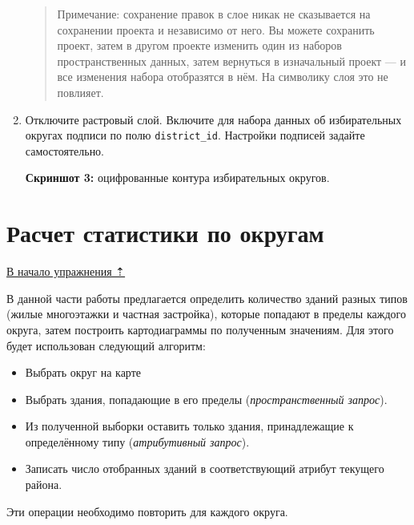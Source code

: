 \documentclass[
  12pt,
]{book}
\begin{document}
\begin{enumerate}
  \begin{quote}
  Примечание: сохранение правок в слое никак не сказывается на сохранении проекта и независимо от него. Вы можете сохранить проект, затем в другом проекте изменить один из наборов пространственных данных, затем вернуться в изначальный проект --- и все изменения набора отобразятся в нём. На символику слоя это не повлияет.
  \end{quote}
\item
  Отключите растровый слой. Включите для набора данных об избирательных округах подписи по полю \texttt{district\_id}. Настройки подписей задайте самостоятельно.

  \textbf{Скриншот 3:} оцифрованные контура избирательных округов.
\end{enumerate}

\hypertarget{map-ref-districts-stats}{%
\section{Расчет статистики по округам}\label{map-ref-districts-stats}}

\protect\hyperlink{map-ref-districts}{В начало упражнения ⇡}

В данной части работы предлагается определить количество зданий разных типов (жилые многоэтажки и частная застройка), которые попадают в пределы каждого округа, затем построить картодиаграммы по полученным значениям. Для этого будет использован следующий алгоритм:

\begin{itemize}
\item
  Выбрать округ на карте
\item
  Выбрать здания, попадающие в его пределы (\emph{пространственный запрос}).
\item
  Из полученной выборки оставить только здания, принадлежащие к определённому типу (\emph{атрибутивный запрос}).
\item
  Записать число отобранных зданий в соответствующий атрибут текущего района.
\end{itemize}

Эти операции необходимо повторить для каждого округа.
\end{document}
